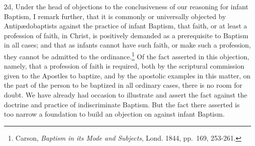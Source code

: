 \documentclass[]{book}
\begin{document}
2d, Under the head of objections to the conclusiveness of our reasoning for infant Baptism, I remark further, that it is commonly or universally objected by Antipædobaptists against the practice of infant Baptism, that faith, or at least a profession of faith, in Christ, is positively demanded as a prerequisite to Baptism in all cases; and that as infants cannot have such faith, or make such a profession, they cannot be admitted to the ordinance.\footnote{Carson, \emph{Baptism in its Mode and Subjects}, Lond. 1844, pp.~169, 253-261.} Of the fact asserted in this objection, namely, that a profession of faith is required, both by the scriptural commission given to the Apostles to baptize, and by the apostolic examples in this matter, on the part of the person to be baptized in all ordinary cases, there is no room for doubt. We have already had occasion to illustrate and assert the fact against the doctrine and practice of indiscriminate Baptism. But the fact there asserted is too narrow a foundation to build an objection on against infant Baptism.
\end{document}

